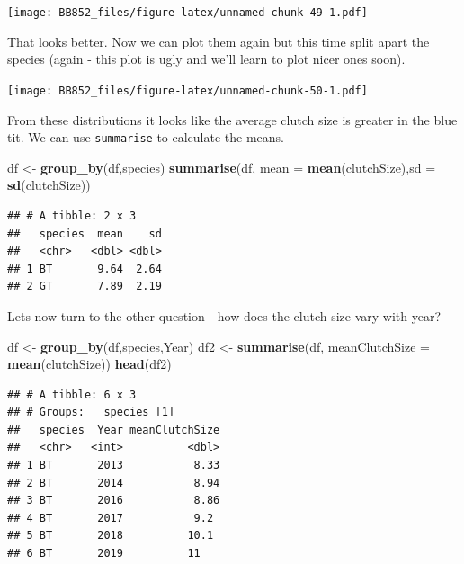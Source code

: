 \documentclass[
  a4paperpaper,
]{book}
\newenvironment{Shaded}{\begin{snugshade}}{\end{snugshade}}
\newcommand{\DataTypeTok}[1]{\textcolor[rgb]{0.13,0.29,0.53}{#1}}
\newcommand{\KeywordTok}[1]{\textcolor[rgb]{0.13,0.29,0.53}{\textbf{#1}}}
\newcommand{\NormalTok}[1]{#1}
\newcommand{\OperatorTok}[1]{\textcolor[rgb]{0.81,0.36,0.00}{\textbf{#1}}}
\newcommand{\StringTok}[1]{\textcolor[rgb]{0.31,0.60,0.02}{#1}}
\begin{document}
\texttt{[image: BB852\_files/figure-latex/unnamed-chunk-49-1.pdf]}

That looks better.
Now we can plot them again but this time split apart the species (again - this plot is ugly and we'll learn to plot nicer ones soon).

\begin{Shaded}
\end{Shaded}

\texttt{[image: BB852\_files/figure-latex/unnamed-chunk-50-1.pdf]}

From these distributions it looks like the average clutch size is greater in the blue tit. We can use \texttt{summarise} to calculate the means.

\begin{Shaded}
\begin{Highlighting}[]
\NormalTok{df \textless{}{-}}\StringTok{ }\KeywordTok{group\_by}\NormalTok{(df,species)}
\KeywordTok{summarise}\NormalTok{(df, }\DataTypeTok{mean =} \KeywordTok{mean}\NormalTok{(clutchSize),}\DataTypeTok{sd =} \KeywordTok{sd}\NormalTok{(clutchSize))}
\end{Highlighting}
\end{Shaded}

\begin{verbatim}
## # A tibble: 2 x 3
##   species  mean    sd
##   <chr>   <dbl> <dbl>
## 1 BT       9.64  2.64
## 2 GT       7.89  2.19
\end{verbatim}

Lets now turn to the other question - how does the clutch size vary with year?

\begin{Shaded}
\begin{Highlighting}[]
\NormalTok{df \textless{}{-}}\StringTok{ }\KeywordTok{group\_by}\NormalTok{(df,species,Year)}
\NormalTok{df2 \textless{}{-}}\StringTok{ }\KeywordTok{summarise}\NormalTok{(df, }\DataTypeTok{meanClutchSize =} \KeywordTok{mean}\NormalTok{(clutchSize))}
\KeywordTok{head}\NormalTok{(df2)}
\end{Highlighting}
\end{Shaded}

\begin{verbatim}
## # A tibble: 6 x 3
## # Groups:   species [1]
##   species  Year meanClutchSize
##   <chr>   <int>          <dbl>
## 1 BT       2013           8.33
## 2 BT       2014           8.94
## 3 BT       2016           8.86
## 4 BT       2017           9.2 
## 5 BT       2018          10.1 
## 6 BT       2019          11
\end{verbatim}
\end{document}
